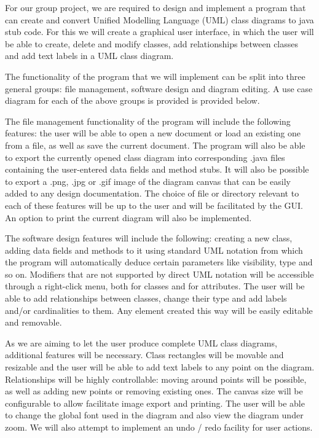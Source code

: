
\tab For our group project, we are required to design and implement a program that can create and convert Unified Modelling Language (UML) class diagrams to java stub code. For this we will create a graphical user interface, in which the user will be able to create, delete and modify classes, add relationships between classes and add text labels in a UML class diagram. 

The functionality of the program that we will implement can be split into three general groups: file management, software design and diagram editing. A use case diagram for each of the above groups is provided is provided below. 


The file management functionality of the program will include the following features: the user will be able to open a new document or load an existing one from a file, as well as save the current document. The program will also be able to export the currently opened class diagram into corresponding .java files containing the user-entered data fields and method stubs. It will also be possible to export a .png, .jpg or .gif image of the diagram canvas that can be easily added to any design documentation. The choice of file or directory relevant to each of these features will be up to the user and will be facilitated by the GUI. An option to print the current diagram will also be implemented.
 

The software design features will include the following: creating a new class, adding data fields and methods to it using standard UML notation from which the program will automatically deduce certain parameters like visibility, type and so on. Modifiers that are not supported by direct UML notation will be accessible through a right-click menu, both for classes and for attributes. The user will be able to add relationships between classes, change their type and add labels and/or cardinalities to them. Any element created this way will be easily editable and removable.


As we are aiming to let the user produce complete UML class diagrams, additional features will be necessary. Class rectangles will be movable and resizable and the user will be able to add text labels to any point on the diagram. Relationships will be highly controllable: moving around points will be possible, as well as adding new points or removing existing ones. The canvas size will be configurable to allow facilitate image export and printing. The user will be able to change the global font used in the diagram and also view the diagram under zoom. We will also attempt to implement an undo / redo facility for user actions.